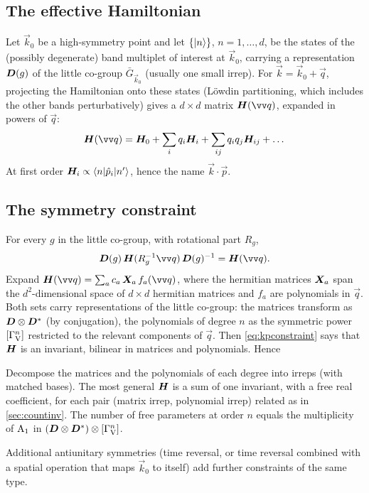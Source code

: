 \subsection{The effective Hamiltonian}
Let $\vec{k}_0$ be a high-symmetry point and let $\{\lvert n\rangle\}$, $n=1,\dots,d$, be the states
of the (possibly degenerate) band multiplet of interest at $\vec{k}_0$, carrying a
representation $\bm{D}(g)$ of the little co-group $\bar{G}_{\vec{k}_0}$ (usually one small
irrep). For $\vec{k}=\vec{k}_0+\vec{q}$, projecting the Hamiltonian onto these states
(L\"owdin partitioning, which includes the other bands perturbatively) gives a
$d\times d$ matrix $\mat{H}(\vec{q})$, expanded in powers of $\vec{q}$:
\[
\mat{H}(\vec{q})=\mat{H}_0+\sum_iq_i\mat{H}_i+\sum_{ij}q_iq_j\mat{H}_{ij}+\dots
\]
At first order $\bm{H}_i\propto\langle n\rvert\hat{p}_i\lvert n'\rangle$, hence the name
$\vec{k}\cdot\vec{p}$.

\subsection{The symmetry constraint}
For every $g$ in the little co-group, with rotational part $R_g$,
\begin{equation}\label{eq:kpconstraint}
\mat{D}(g)\,\mat{H}(R_g^{-1}\vec{q})\,\mat{D}(g)^{-1}=\mat{H}(\vec{q}).
\end{equation}
Expand $\mat{H}(\vec{q})=\sum_ac_a\,\mat{X}_a\,f_a(\vec{q})$, where the hermitian matrices
$\bm{X}_a$ span the $d^2$-dimensional space of $d\times d$ hermitian matrices and
$f_a$ are polynomials in $\vec{q}$. Both sets carry representations of the little
co-group: the matrices transform as $\bm{D}\otimes\bm{D}^{*}$ (by conjugation), the
polynomials of degree $n$ as the symmetric power $[\Gamma_{\mathrm{V}}^n]$ restricted to the relevant
components of $\vec{q}$. Then \eqref{eq:kpconstraint} says that $\bm{H}$ is an
invariant, bilinear in matrices and polynomials. Hence
\begin{keyresult}
Decompose the matrices and the polynomials of each degree into irreps (with matched
bases). The most general $\bm{H}$ is a sum of one invariant, with a free real
coefficient, for each pair (matrix irrep, polynomial irrep) related as in
\cref{sec:countinv}. The number of free parameters at order $n$ equals the multiplicity
of $\mathrm{A}_1$ in $(\bm{D}\otimes\bm{D}^{*})\otimes[\Gamma_{\mathrm{V}}^n]$.
\end{keyresult}
Additional antiunitary symmetries (time reversal, or time reversal combined with a
spatial operation that maps $\vec{k}_0$ to itself) add further constraints of the same
type.

